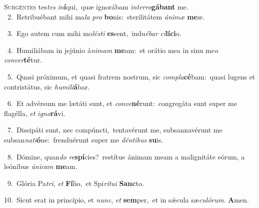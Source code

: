 \lettrine{\initial\textcolor{\initialcolor}{S}}{urgéntes} tes\textit{tes} \textit{in}\-\textbf{í}qui,~\star quæ ignorábam \textit{in}\-\textit{ter}\textit{ro}\textbf{gá}\textbf{bant} me.\\
{\numbfont\textcolor{\numbcolor}{~2.}}~Retribuébant mihi ma\textit{la} \textit{pro} \textbf{bo}\-nis:~\star sterilitátem \textit{á}\-\textit{ni}\textit{mæ} \textbf{me}\-æ.\par
{\numbfont\textcolor{\numbcolor}{~3.}}~Ego autem cum mihi mo\-\textit{lés}\-\textit{ti} \textbf{es}\-sent,~\star indu\-\textit{é}\-\textit{bar} \textit{ci}\-\textbf{lí}\textbf{ci}o.\par
{\numbfont\textcolor{\numbcolor}{~4.}}~Humiliábam in jejúnio á\-\textit{ni}\-\textit{mam} \textbf{me}\-am:~\star et orátio mea in sinu me\textit{o} \textit{con}\-\textit{ver}\textbf{té}tur.\par
{\numbfont\textcolor{\numbcolor}{~5.}}~Quasi próximum, et quasi fratrem nostrum, sic \textit{com}\-\textit{pla}\textbf{cé}bam:~\star quasi lugens et contristátus, sic \textit{hu}\-\textit{mi}\textit{li}\textbf{á}bar.\par
{\numbfont\textcolor{\numbcolor}{~6.}}~Et advérsum me lætáti sunt, et \textit{con}\-\textit{ve}\textbf{né}runt:~\star congregáta sunt super me flagélla, \textit{et} \textit{i}\-\textit{gno}\textbf{rá}vi.\par
{\numbfont\textcolor{\numbcolor}{~7.}}~Dissipáti sunt, nec compúncti,~\dagger tentavérunt me, subsannavérunt me subsan\-\textit{na}\-\textit{ti}\textbf{ó}ne:~\star frenduérunt super me \textit{dén}\-\textit{ti}\textit{bus} \textbf{su}\-is.\par
{\numbfont\textcolor{\numbcolor}{~8.}}~Dómine, quan\textit{do} \textit{re}\-\textbf{spí}cies?~\star restítue ánimam meam a malignitáte eórum, a leónibus \textit{ú}\-\textit{ni}\textit{cam} \textbf{me}\-am.\par
{\numbfont\textcolor{\numbcolor}{~9.}}~Glória Pa\-\textit{tri}\-, \textit{et} \textbf{Fí}\-lio,~\star et Spi\-\textit{rí}\-\textit{tu}\textit{i} \textbf{Sanc}\-to.\par
{\numbfont\textcolor{\numbcolor}{10.}}~Sicut erat in princípio, et \textit{nunc}\-, \textit{et} \textbf{sem}\-per,~\star et in sǽcula sæ\-\textit{cu}\-\textit{ló}\textit{rum}. \textbf{A}\-men.\par
